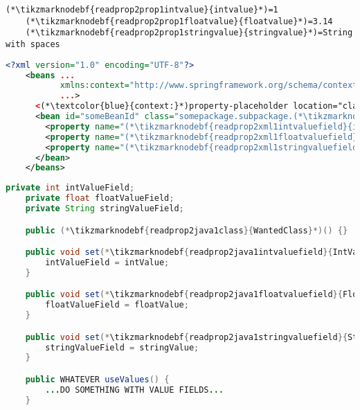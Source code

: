 \begin{lstlisting}[title={A \path{.properties} file called \tikzmarknodebf{readprop2prop1filename}{\textit{setters.properties}}}]
    (*\tikzmarknodebf{readprop2prop1intvalue}{intvalue}*)=1
    (*\tikzmarknodebf{readprop2prop1floatvalue}{floatvalue}*)=3.14
    (*\tikzmarknodebf{readprop2prop1stringvalue}{stringvalue}*)=String with spaces
\end{lstlisting}
\begin{lstlisting}[language=XML, title={Configuration XML}]
    <?xml version="1.0" encoding="UTF-8"?>
    <beans ...
           xmlns:context="http://www.springframework.org/schema/context"
           ...>
      <(*\textcolor{blue}{context:}*)property-placeholder location="classpath:(*\tikzmarknodebf{readprop2xml1filename}{setter.properties}[ForestGreen]*)" file-encoding="utf-8"/>
      <bean id="someBeanId" class="somepackage.subpackage.(*\tikzmarknodebf{readprop2xml1class}{WantedClass}[ForestGreen]*)">
        <property name="(*\tikzmarknodebf{readprop2xml1intvaluefield}{intValueField}[ForestGreen]*)" value="(*\textcolor{ForestGreen}{\$\{}\tikzmarknodebf{readprop2xml1intvalue}{intvalue}[ForestGreen]\textcolor{ForestGreen}{\}}*)"/>
        <property name="(*\tikzmarknodebf{readprop2xml1floatvaluefield}{floatValueField}[ForestGreen]*)" value="(*\textcolor{ForestGreen}{\$\{}\tikzmarknodebf{readprop2xml1floatvalue}{floatvalue}[ForestGreen]\textcolor{ForestGreen}{\}}*)"/>
        <property name="(*\tikzmarknodebf{readprop2xml1stringvaluefield}{stringValueField}[ForestGreen]*)" value="(*\textcolor{ForestGreen}{\$\{}\tikzmarknodebf{readprop2xml1stringvalue}{stringvalue}[ForestGreen]\textcolor{ForestGreen}{\}}*)"/>
      </bean>
    </beans>
\end{lstlisting}
\begin{lstlisting}[language=Java, title={Wanted class with the zero--parameter constructor and setter methods}]
    private int intValueField;
    private float floatValueField;
    private String stringValueField;

    public (*\tikzmarknodebf{readprop2java1class}{WantedClass}*)() {}

    public void set(*\tikzmarknodebf{readprop2java1intvaluefield}{IntValueField}*)(int intValue) {
        intValueField = intValue;
    }

    public void set(*\tikzmarknodebf{readprop2java1floatvaluefield}{FloatValueField}*)(float floatValue) {
        floatValueField = floatValue;
    }

    public void set(*\tikzmarknodebf{readprop2java1stringvaluefield}{StringValueField}*)(string stringValue) {
        stringValueField = stringValue;
    }

    public WHATEVER useValues() {
        ...DO SOMETHING WITH VALUE FIELDS...
    }
\end{lstlisting}
